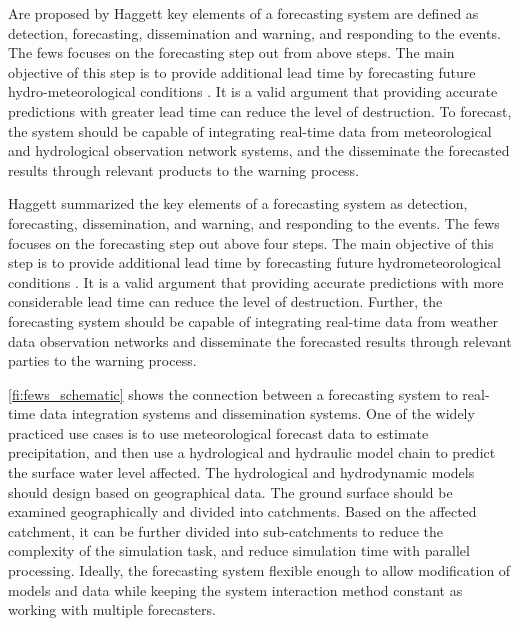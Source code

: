 Are proposed by Haggett \cite{Haggett1998AnWales} key elements of a forecasting system are defined as detection, forecasting, dissemination and warning, and responding to the events. The \acrshort{fews} focuses on the forecasting step out from above steps. The main objective of this step is to provide additional lead time by forecasting future hydro-meteorological conditions \cite{Werner2005FloodCatchments}. It is a valid argument that providing accurate predictions with greater lead time can reduce the level of destruction. To forecast, the system should be capable of integrating real-time data from meteorological and hydrological observation network systems, and the disseminate the forecasted results through relevant products to the warning process.

Haggett \cite{Haggett1998AnWales} summarized the key elements of a forecasting system as detection, forecasting, dissemination, and warning, and responding to the events. The \acrshort{fews} focuses on the forecasting step out above four steps. The main objective of this step is to provide additional lead time by forecasting future hydrometeorological conditions \cite{Werner2005FloodCatchments}. It is a valid argument that providing accurate predictions with more considerable lead time can reduce the level of destruction. Further, the forecasting system should be capable of integrating real-time data from weather data observation networks and disseminate the forecasted results through relevant parties to the warning process.

\cref{fi:fews_schematic} shows the connection between a forecasting system to real-time data integration systems and dissemination systems. One of the widely practiced use cases is to use meteorological forecast data to estimate precipitation, and then use a hydrological and hydraulic model chain to predict the surface water level affected. The hydrological and hydrodynamic models should design based on geographical data. The ground surface should be examined geographically and divided into catchments. Based on the affected catchment, it can be further divided into sub-catchments to reduce the complexity of the simulation task, and reduce simulation time with parallel processing. Ideally, the forecasting system flexible enough to allow modification of models and data while keeping the system interaction method constant as working with multiple forecasters.

